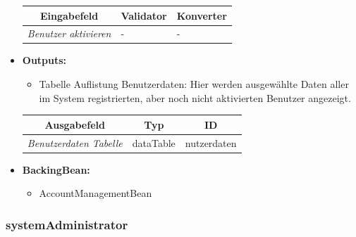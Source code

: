 \begin{itemize}
				\begin{center}
					\begin{longtable}{|p{3cm} |p{8cm} | p{5cm}|}
						
						\hline \multicolumn{1}{|c|}{\textbf{Eingabefeld}} & \multicolumn{1}{|c|}{\textbf{Validator}} & \multicolumn{1}{|c|}{\textbf{Konverter}} \\ \hline
						\endfirsthead
						\hline
						\endlastfoot
						\textit{Benutzer aktivieren} & - & - \\ \hline
					\end{longtable}
				\end{center}
				
			\item \textbf{Outputs:}
				\begin{itemize}
					\item Tabelle Auflistung Benutzerdaten: Hier werden ausgewählte Daten aller im System registrierten, aber noch nicht aktivierten Benutzer angezeigt.
				\end{itemize}
				
					\begin{center}
						\begin{longtable}{|p{5cm} | p{4cm}|p{3cm}|}
							
							\hline \multicolumn{1}{|c|}{\textbf{Ausgabefeld}} & \multicolumn{1}{|c|}{\textbf{Typ}}  &  \multicolumn{1}{|c|}{\textbf{ID}} \\ \hline
							\endfirsthead
							\hline
							\endlastfoot
							\textit{Benutzerdaten Tabelle}  & dataTable & nutzerdaten \\ \hline
						\end{longtable}
					\end{center}
				
			\item \textbf{BackingBean:}
				\begin{itemize}
					\item AccountManagementBean
				\end{itemize}
		\end{itemize}
		
		\subsubsection{systemAdministrator}
		
